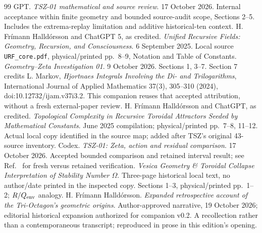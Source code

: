 \begin{thebibliography}{99}
 GPT. \emph{TSZ-01 mathematical and source review}. 17 October 2026. Internal acceptance within finite geometry and bounded source-audit scope, Sections 2--5. Includes the extrema-replay limitation and additive historical-ten context.
 H. Fr\'imann Halld\'orsson and ChatGPT 5, as credited. \emph{Unified Recursive Fields: Geometry, Recursion, and Consciousness}. 6 September 2025. Local source \texttt{URF\_core.pdf}, physical/printed pp.~8--9, Notation and Table of Constants.
 \emph{Geometry--Zeta Investigation 01}. 9 October 2026. Sections 1, 3--7. Section 7 credits L. Markov, \emph{Hjortnaes Integrals Involving the Di- and Trilogarithms}, International Journal of Applied Mathematics 37(3), 305--310 (2024), doi:10.12732/ijam.v37i3.2. This companion reuses that accepted attribution, without a fresh external-paper review.
 H. Fr\'imann Halld\'orsson and ChatGPT, as credited. \emph{Topological Complexity in Recursive Toroidal Attractors Seeded by Mathematical Constants}. June 2025 compilation; physical/printed pp.~7--8, 11--12. Actual local copy identified in the source map; added after TSZ's original 43-source inventory.
 Codex. \emph{TSZ-01: Zeta, action and residual comparison}. 17 October 2026. Accepted bounded comparison and retained interval result; see Ref.~\cite{TSZReview} for fresh versus retained verification.
 \emph{Vesica Geometry \& Toroidal Collapse Interpretation of Stability Number $\Omega$}. Three-page historical local text, no author/date printed in the inspected copy. Sections 1--3, physical/printed pp.~1--2; $R/Q_{\rm env}$ analogy.
 H. Fr\'imann Halld\'orsson. \emph{Expanded retrospective account of the Tri-Octagon's geometric origins}. Author-approved narrative, 19 October 2026; editorial historical expansion authorized for companion v0.2. A recollection rather than a contemporaneous transcript; reproduced in prose in this edition's opening.
\end{thebibliography}
